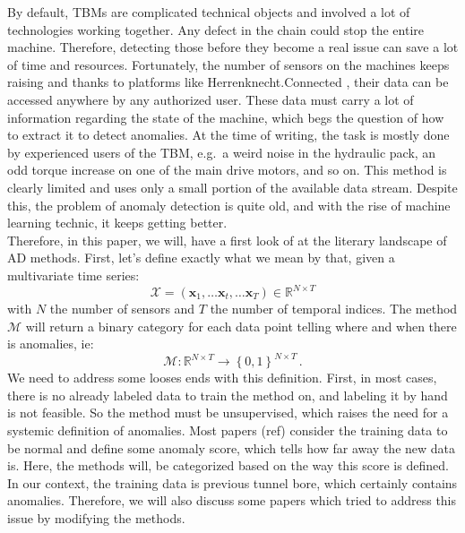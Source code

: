 \documentclass[../../main/main.tex]{subfiles}
\begin{document}

    By default, \acp{TBM} are complicated technical objects and involved a lot of technologies working together. Any defect in the chain
    could stop the entire machine. Therefore, detecting those before they become a real issue can save a lot of time and resources. Fortunately, the number
    of sensors on the machines keeps raising and thanks to platforms like Herrenknecht.Connected \cite{HKC.2024}, their data can be accessed anywhere by any authorized user. These data
    must carry a lot of information regarding the state of the machine, which begs the question of how to extract it to detect anomalies. At the time of writing,
    the task is mostly done by experienced users of the \ac{TBM}, e.g.~a weird noise in the hydraulic pack, an odd torque increase on one of the main drive motors,
    and so on. This method is clearly limited and uses only a small portion of the available data stream. Despite this, the problem of anomaly detection is quite
    old, and with the rise of machine learning technic, it keeps getting better. \\
    Therefore, in this paper, we will, have a first look of at the literary landscape of \ac{AD} methods. First, let's define exactly what we mean by that, given a multivariate time series: 
    \begin{equation}
        \mathcal{X} = (\textbf{x}_1, \dots \textbf{x}_t, \dots \textbf{x}_T) \in \mathbb{R}^{N \times T}
    \end{equation}
    with $N$ the number of sensors and $T$ the number of temporal indices. The method $\mathcal{M} $ will return a binary category for each data point 
    telling where and when there is anomalies, ie:
    \begin{equation}
        \mathcal{M} : \mathbb{R}^{N \times T} \to \left\{0, 1\right\} ^{N \times T} \, .
    \end{equation}
    We need to address some looses ends with this definition. First, in most cases, there is no already labeled data to train the method on, and labeling it
    by hand is not feasible. So the method must be unsupervised, which raises the need for a systemic definition of anomalies. Most papers (ref) consider the
    training data to be normal and define some anomaly score, which tells how far away the new data is. Here, the methods will, be categorized based on the way
    this score is defined.\\
    In our context, the training data is previous tunnel bore, which certainly contains anomalies. Therefore, we will also discuss some papers which tried to
    address this issue by modifying the methods. 
\end{document}
